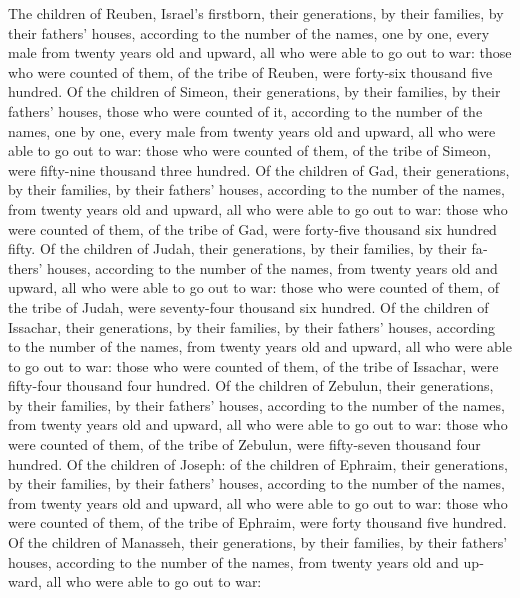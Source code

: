 \begin{paracol}{2}
\begin{otherlanguage}{english}
 The children of Reuben, Israel's firstborn, their
generations, by their families, by their fathers' houses, according to
the number of the names, one by one, every male from twenty years old
and upward, all who were able to go out to war:  those
who were counted of them, of the tribe of Reuben, were forty-six
thousand five hundred.  Of the children of Simeon, their
generations, by their families, by their fathers' houses, those who were
counted of it, according to the number of the names, one by one, every
male from twenty years old and upward, all who were able to go out to
war:  those who were counted of them, of the tribe of
Simeon, were fifty-nine thousand three hundred.  Of the
children of Gad, their generations, by their families, by their fathers'
houses, according to the number of the names, from twenty years old and
upward, all who were able to go out to war:  those who
were counted of them, of the tribe of Gad, were forty-five thousand six
hundred fifty.  Of the children of Judah, their
generations, by their families, by their fathers' houses, according to
the number of the names, from twenty years old and upward, all who were
able to go out to war:  those who were counted of them,
of the tribe of Judah, were seventy-four thousand six hundred.
 Of the children of Issachar, their generations, by their
families, by their fathers' houses, according to the number of the
names, from twenty years old and upward, all who were able to go out to
war:  those who were counted of them, of the tribe of
Issachar, were fifty-four thousand four hundred.  Of the
children of Zebulun, their generations, by their families, by their
fathers' houses, according to the number of the names, from twenty years
old and upward, all who were able to go out to war: 
those who were counted of them, of the tribe of Zebulun, were
fifty-seven thousand four hundred.  Of the children of
Joseph: of the children of Ephraim, their generations, by their
families, by their fathers' houses, according to the number of the
names, from twenty years old and upward, all who were able to go out to
war:  those who were counted of them, of the tribe of
Ephraim, were forty thousand five hundred.  Of the
children of Manasseh, their generations, by their families, by their
fathers' houses, according to the number of the names, from twenty years
old and upward, all who were able to go out to war: 

\end{otherlanguage}
\end{paracol}
